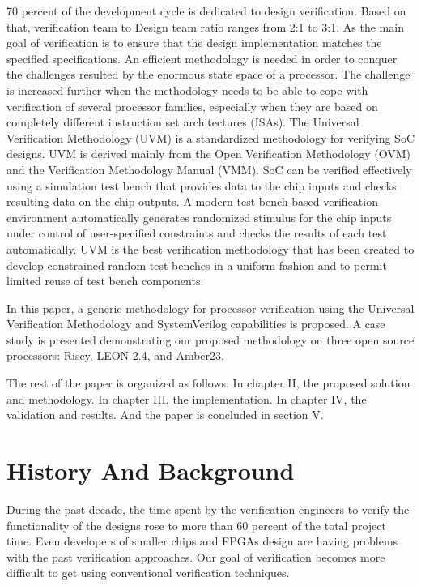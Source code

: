 \documentclass[conference,10 pt,twoside]{IEEEtran}
\begin{document}
70 percent of the development cycle is dedicated to design verification. Based on that, verification team to Design team ratio ranges from 2:1 to 3:1. As the main goal of verification is to ensure that the design implementation matches the specified specifications. An efficient methodology is needed in order to conquer the challenges resulted by the enormous state space of a processor. The challenge is increased further when the methodology needs to be able to cope with verification of several processor families, especially when they are based on completely different instruction set architectures (ISAs). The Universal Verification Methodology (UVM) is a standardized methodology for verifying SoC designs. UVM is derived mainly from the Open Verification Methodology (OVM) and the Verification Methodology Manual (VMM). 
SoC can be verified effectively using a simulation test bench that provides data to the chip inputs and checks resulting data on the chip outputs. A modern test bench-based verification environment automatically generates randomized stimulus for the chip inputs under control of user-specified constraints and checks the results of each test automatically. UVM is the best verification methodology that has been created to develop constrained-random test benches in a uniform fashion and to permit limited reuse of test bench components\cite{b2}.
\par
In this paper, a generic methodology for processor verification using the Universal Verification Methodology and SystemVerilog capabilities is proposed. A case study is presented demonstrating our proposed methodology on three open source processors: Riscy, LEON 2.4, and Amber23.
\par
The rest of the paper is organized as follows: In chapter II, the proposed solution and methodology. In chapter III, the implementation. In chapter IV, the validation and results. And the paper is concluded in section V.

\section{History And Background}


      During the past decade, the time spent by the verification engineers to verify the functionality of the designs rose to more than 60 percent of the total project time. Even developers of smaller chips and FPGAs design are having problems with the past verification approaches. Our goal of verification becomes more difficult to get using conventional verification techniques.
 
\end{document}
